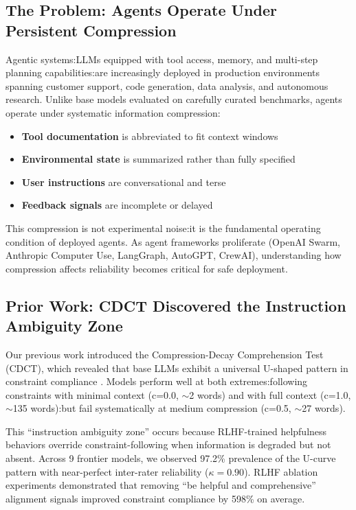 \documentclass[11pt]{article}
\begin{document}
\subsection{The Problem: Agents Operate Under Persistent Compression}

Agentic systems:LLMs equipped with tool access, memory, and multi-step planning capabilities:are increasingly deployed in production environments spanning customer support, code generation, data analysis, and autonomous research. Unlike base models evaluated on carefully curated benchmarks, agents operate under systematic information compression:

\begin{itemize}
\item \textbf{Tool documentation} is abbreviated to fit context windows
\item \textbf{Environmental state} is summarized rather than fully specified
\item \textbf{User instructions} are conversational and terse
\item \textbf{Feedback signals} are incomplete or delayed
\end{itemize}

This compression is not experimental noise:it is the fundamental operating condition of deployed agents. As agent frameworks proliferate (OpenAI Swarm, Anthropic Computer Use, LangGraph, AutoGPT, CrewAI), understanding how compression affects reliability becomes critical for safe deployment.

\subsection{Prior Work: CDCT Discovered the Instruction Ambiguity Zone}

Our previous work introduced the Compression-Decay Comprehension Test (CDCT), which revealed that base LLMs exhibit a universal U-shaped pattern in constraint compliance \cite{baxi2025cdct}. Models perform well at both extremes:following constraints with minimal context (c=0.0, $\sim$2 words) and with full context (c=1.0, $\sim$135 words):but fail systematically at medium compression (c=0.5, $\sim$27 words).

This ``instruction ambiguity zone'' occurs because RLHF-trained helpfulness behaviors override constraint-following when information is degraded but not absent. Across 9 frontier models, we observed 97.2\% prevalence of the U-curve pattern with near-perfect inter-rater reliability ($\kappa=0.90$). RLHF ablation experiments demonstrated that removing ``be helpful and comprehensive'' alignment signals improved constraint compliance by 598\% on average.
\end{document}
